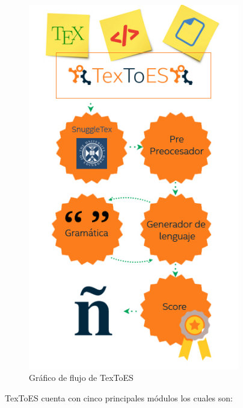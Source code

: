 \begin{figure}[H]
\centering
  \includegraphics[width=9.22cm, height=16cm]{Figures/detalle-arqui}
  \caption[]{Gráfico de flujo de TexToES}
\label{fig:arquitectura}
\end{figure}

TexToES cuenta con cinco principales módulos los cuales son:

